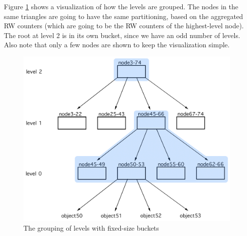 Figure \ref{fig:fixed-size-buckets} shows a visualization of how the levels are grouped. The nodes in the same triangles are going to have the same partitioning, based on the aggregated RW counters (which are going to be the RW counters of the highest-level node). The root at level 2 is in its own bucket, since we have an odd number of levels. Also note that only a few nodes are shown to keep the visualization simple.

\begin{figure}[!htb]
  \centering
  \includegraphics[width=\textwidth,height=\textheight,keepaspectratio]{img/grouped-levels.png}
  \caption{ The grouping of levels with fixed-size buckets}
  \label{fig:fixed-size-buckets}
\end{figure}

